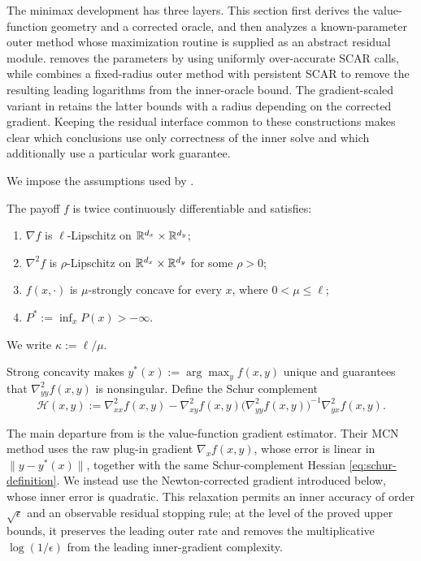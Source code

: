 \documentclass{article}
\begin{document}
The minimax development has three layers.  This section first derives
the value-function geometry and a corrected oracle, and then analyzes a
known-parameter outer method whose maximization routine is supplied as
an abstract residual module.   removes the
parameters by using uniformly over-accurate SCAR calls, while
 combines a fixed-radius outer method with
persistent SCAR to remove the resulting leading logarithms from the
inner-oracle bound.  The gradient-scaled variant in
 retains the latter bounds with a radius
depending on the corrected gradient.  Keeping the residual interface
common to these constructions makes clear which conclusions use only
correctness of the inner
solve and which additionally use a particular work guarantee.

We impose the assumptions used by \citet{luo2022finding}.

\begin{assumption}[NC--SC regularity]\label{ass:ncsc}
The payoff $f$ is twice continuously differentiable and satisfies:
\begin{enumerate}[label=(\roman*)]
  \item $\nabla f$ is $\ell$-Lipschitz on
  $\mathbb{R}^{d_x}\times\mathbb{R}^{d_y}$;
  \item $\nabla^2f$ is $\rho$-Lipschitz on
  $\mathbb{R}^{d_x}\times\mathbb{R}^{d_y}$ for some $\rho>0$;
  \item $f(x,\cdot)$ is $\mu$-strongly concave for every $x$, where
  $0<\mu\le\ell$;
  \item $P^*:=\inf_xP(x)>-\infty$.
\end{enumerate}
We write $\kappa:=\ell/\mu$.
\end{assumption}

Strong concavity makes
$y^*(x):=\arg\max_y f(x,y)$ unique and guarantees that
$\nabla^2_{yy}f(x,y)$ is nonsingular.  Define the Schur complement
\begin{equation}\label{eq:schur-definition}
 \mathcal H(x,y):=\nabla^2_{xx}f(x,y)
 -\nabla^2_{xy}f(x,y)
  \bigl(\nabla^2_{yy}f(x,y)\bigr)^{-1}
  \nabla^2_{yx}f(x,y).
\end{equation}

The main departure from \citet{luo2022finding} is the value-function
gradient estimator.  Their MCN method uses the raw plug-in gradient
$\nabla_xf(x,y)$, whose error is linear in $\|y-y^*(x)\|$, together
with the same Schur-complement Hessian \eqref{eq:schur-definition}.
We instead use the Newton-corrected gradient introduced below, whose
inner error is quadratic.  This relaxation permits an inner accuracy
of order $\sqrt\epsilon$ and an observable residual stopping rule;
at the level of the proved upper bounds, it preserves the leading outer
rate and removes the multiplicative $\log(1/\epsilon)$ from the leading
inner-gradient complexity.
\end{document}

